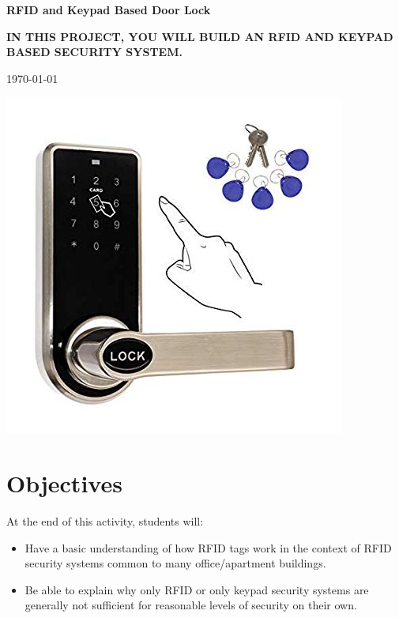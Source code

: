 \documentclass{article}
\begin{document}
    \begin{titlepage}
      \centering
        \vfill
        {\bfseries\Huge
          RFID and Keypad Based Door Lock \\
            \vskip2cm
          }

          {\bfseries\Large
            IN THIS PROJECT, YOU WILL BUILD AN RFID AND KEYPAD BASED SECURITY SYSTEM.\\
          } {

            \vskip1cm
            \today\\
        }
        \vfill
        \includegraphics[width=\textwidth]{figures/diagram.jpg}
        \vfill
        \vfill
    \end{titlepage}
\newpage

\section{Objectives}\label{sec:objectives}
At the end of this activity, students will:

\begin{itemize}
\item {Have a basic understanding of how RFID tags work in the context of RFID
    security systems common to many office/apartment buildings. }
\item {Be able to explain why only RFID or only keypad security systems are generally
    not sufficient for reasonable levels of security on their own. }
\end{itemize}
\end{document}
